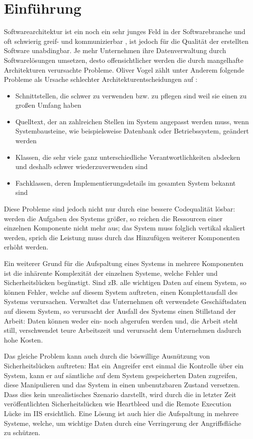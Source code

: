 \chapter{Einführung}
Softwarearchitektur ist ein noch ein sehr junges Feld in der Softwarebranche und oft schwierig greif- und kommunizierbar \cite[S. 8]{softarch}, ist jedoch für die Qualität der erstellten Software unabdingbar. Je mehr Unternehmen ihre Datenverwaltung durch Softwarelösungen umsetzen, desto offensichtlicher werden die durch mangelhafte Architekturen verursachte Probleme. Oliver Vogel zählt unter Anderem folgende Probleme als Ursache schlechter Architekturentscheidungen auf \cite[S. 7]{softarch}:

\begin{itemize}
  \item \glqq Schnittstellen, die schwer zu verwenden bzw. zu pflegen sind weil sie einen zu großen Umfang haben\grqq
  \item \glqq Quelltext, der an zahlreichen Stellen im System angepasst werden muss, wenn Systembausteine, wie beispielsweise Datenbank oder Betriebssystem, geändert werden\grqq
  \item \glqq Klassen, die sehr viele ganz unterschiedliche Verantwortlichkeiten abdecken und deshalb schwer wiederzuverwenden sind\grqq
  \item \glqq Fachklassen, deren Implementierungsdetails im gesamten System bekannt sind\grqq
\end{itemize}

Diese Probleme sind jedoch nicht nur durch eine bessere Codequalität lösbar: werden die Aufgaben des Systems größer, so reichen die Ressourcen einer einzelnen Komponente nicht mehr aus; das System muss folglich vertikal skaliert werden, sprich die Leistung muss durch das Hinzufügen weiterer Komponenten erhöht werden.

Ein weiterer Grund für die Aufspaltung eines Systems in mehrere Komponenten ist die inhärente Komplexität der einzelnen Systeme, welche Fehler und Sicherheitslücken begünstigt. Sind zB. alle wichtigen Daten auf einem System, so können Fehler, welche auf diesem System auftreten, einen Komplettausfall des Systems verursachen. Verwaltet das Unternehmen oft verwendete Geschäftsdaten auf diesem System, so verursacht der Ausfall des Systems einen Stillstand der Arbeit: Daten können weder ein- noch abgerufen werden und, die Arbeit steht still, verschwendet teure Arbeitszeit und verursacht dem Unternehmen dadurch hohe Kosten.

Das gleiche Problem kann auch durch die böswillige Ausnützung von Sicherheitslücken auftreten: Hat ein Angreifer erst einmal die Kontrolle über ein System, kann er auf sämtliche auf dem System gespeicherten Daten zugreifen, diese Manipulieren und das System in einen unbenutzbaren Zustand versetzen. Dass dies kein unrealistisches Szenario darstellt, wird durch die in letzter Zeit veröffentlichten Sicherheitslücken wie Heartbleed\cite{heartbleed} und die Remote Execution Lücke im IIS ersichtlich\cite{iis}. Eine Lösung ist auch hier die Aufspaltung in mehrere Systeme, welche, um wichtige Daten durch eine Verringerung der Angriffsfläche zu schützen.

